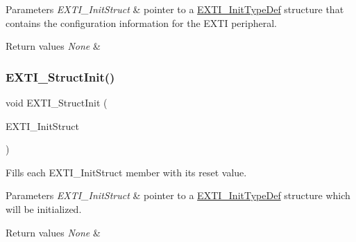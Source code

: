 \begin{DoxyParams}{Parameters}
{\em E\+X\+T\+I\+\_\+\+Init\+Struct} & pointer to a \mbox{\hyperlink{struct_e_x_t_i___init_type_def}{E\+X\+T\+I\+\_\+\+Init\+Type\+Def}} structure that contains the configuration information for the E\+X\+TI peripheral. \\
\hline
\end{DoxyParams}

\begin{DoxyRetVals}{Return values}
{\em None} & \\
\hline
\end{DoxyRetVals}
\mbox{\label{group___e_x_t_i___private___functions_ga86b9e662d18a2f829999cfb26aa7ca20}} 
\subsubsection{\texorpdfstring{EXTI\_StructInit()}{EXTI\_StructInit()}}
{\footnotesize\ttfamily void E\+X\+T\+I\+\_\+\+Struct\+Init (\begin{DoxyParamCaption}\item[{\mbox{\hyperlink{struct_e_x_t_i___init_type_def}{E\+X\+T\+I\+\_\+\+Init\+Type\+Def}} $\ast$}]{E\+X\+T\+I\+\_\+\+Init\+Struct }\end{DoxyParamCaption})}



Fills each E\+X\+T\+I\+\_\+\+Init\+Struct member with its reset value. 


\begin{DoxyParams}{Parameters}
{\em E\+X\+T\+I\+\_\+\+Init\+Struct} & pointer to a \mbox{\hyperlink{struct_e_x_t_i___init_type_def}{E\+X\+T\+I\+\_\+\+Init\+Type\+Def}} structure which will be initialized. \\
\hline
\end{DoxyParams}

\begin{DoxyRetVals}{Return values}
{\em None} & \\
\hline
\end{DoxyRetVals}
